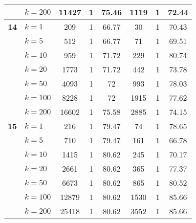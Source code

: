 \begin{table}[htbp]
\begin{tabular}{|l|l|c|c|c|c|c|c|}
     & $k=200$ & 11427 & 1 & 75.46 & 1119 & 1 & 72.44 \\ \hline
    \multicolumn{1}{|r|}{\textbf{14}} & $k=1$ & 209 & 1 & 66.77 & 30 & 1 & 70.43 \\ 
     & $k=5$ & 512 & 1 & 66.77 & 71 & 1 & 69.51 \\ 
     & $k=10$ & 959 & 1 & 71.72 & 229 & 1 & 80.74 \\ 
     & $k=20$ & 1773 & 1 & 71.72 & 442 & 1 & 73.78 \\ 
     & $k=50$ & 4093 & 1 & 72 & 993 & 1 & 78.03 \\ 
     & $k=100$ & 8228 & 1 & 72 & 1915 & 1 & 77.62 \\ 
     & $k=200$ & 16602 & 1 & 75.58 & 2885 & 1 & 74.15 \\ \hline
    \multicolumn{1}{|r|}{\textbf{15}} & $k=1$ & 216 & 1 & 79.47 & 74 & 1 & 78.65 \\ 
     & $k=5$ & 710 & 1 & 79.47 & 161 & 1 & 66.78 \\ 
     & $k=10$ & 1415 & 1 & 80.62 & 245 & 1 & 70.17 \\ 
     & $k=20$ & 2661 & 1 & 80.62 & 365 & 1 & 77.37 \\ 
     & $k=50$ & 6673 & 1 & 80.62 & 865 & 1 & 80.52 \\ 
     & $k=100$ & 12879 & 1 & 80.62 & 1530 & 1 & 85.66 \\ 
     & $k=200$ & 25418 & 1 & 80.62 & 3552 & 1 & 85.66 \\ \hline
    \end{tabular}
\end{table}
